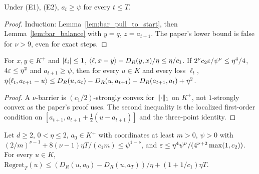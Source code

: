 \begin{lemma}
  \label{lem:bar_iterates_lower}
  \leanok
  Under (E1), (E2), $a_t \ge \psi$ for every $t \le T$.
\end{lemma}

\begin{proof}
  \leanok
  Induction: Lemma~\ref{lem:bar_pull_to_start}, then Lemma~\ref{lem:bar_balance} with
  $y = q$, $z = a_{t+1}$. The paper's lower bound is false for $\nu > 9$, even for exact steps.
\end{proof}

\begin{lemma}
  \label{lem:bar_one_round}
  \leanok
  For $x, y \in K^+$ and $\lvert \ell_i \rvert \le 1$, $\langle \ell, x - y \rangle - D_R(y, x)/\eta \le \eta/c_1$.
  If $2^\nu c_2\varepsilon/\psi^\nu \le \eta^4/4$, $4\varepsilon \le \eta^2$ and $a_{t+1} \ge \psi$, then for every
  $u \in K$ and every loss $\ell_t$,
  $\eta\langle \ell_t, a_{t+1} - u \rangle \le D_R(u, a_t) - D_R(u, a_{t+1}) - D_R(a_{t+1}, a_t) + \eta^2$.
\end{lemma}

\begin{proof}
  \leanok
  A $\nu$-barrier is $(c_1/2)$-strongly convex for $\lVert \cdot \rVert_1$ on $K^+$, not $1$-strongly
  convex as the paper's proof uses. The second inequality is the localized first-order condition
  on $[a_{t+1}, a_{t+1} + \frac12(u - a_{t+1})]$ and the three-point identity.
\end{proof}

\begin{lemma}
  \label{lem:bar_core}
  \leanok
  Let $d \ge 2$, $0 < \eta \le 2$, $a_0 \in K^+$ with coordinates at least $m > 0$, $\psi > 0$ with
  $(2/m)^{\nu-1} + 8(\nu - 1)\eta T/(c_1 m) \le \psi^{1-\nu}$, and
  $\varepsilon \le \eta^4\psi^\nu/(4^{\nu+2}\max(1, c_2))$. For every $u \in K$,
  $\mathrm{Regret}_T(u) \le (D_R(u, a_0) - D_R(u, a_T))/\eta + (1 + 1/c_1)\eta T$.
\end{lemma}

